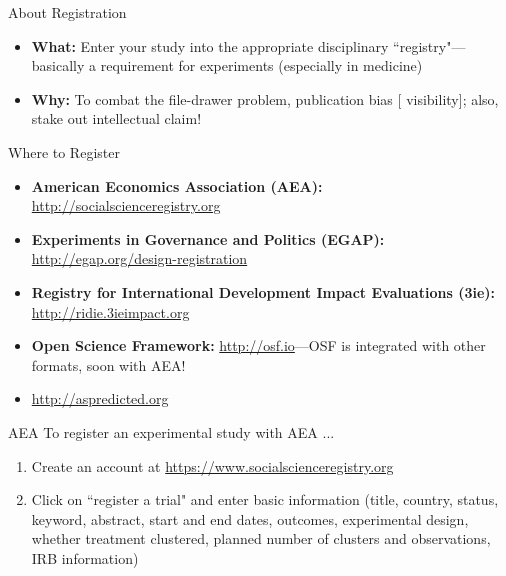 \documentclass[12pt, compress]{beamer} %
\let\noteitem\item %
\renewcommand{\item}{ 
	\noteitem\vspace{\fill}
	}
\newcommand{\nb}[1]{{\color{burntorange} {#1}}}
\begin{document}
	\begin{frame}{About Registration}
		\begin{itemize}
			\item \textbf{What:} Enter your study into the appropriate disciplinary ``registry"---basically a requirement for experiments (especially in medicine)
			\item \textbf{Why:} To combat the file-drawer problem, publication bias [\nb{visibility}]; also, stake out intellectual claim!
		\end{itemize}
	\end{frame}
	
%		
%		
	
	\begin{frame}{Where to Register}
		\begin{itemize}
			\item \textbf{American Economics Association (AEA):} \url{http://socialscienceregistry.org}
			\item \textbf{Experiments in Governance and Politics (EGAP):} \url{http://egap.org/design-registration}
			\item \textbf{Registry for International Development Impact Evaluations (3ie):} \url{http://ridie.3ieimpact.org}
			\item \textbf{Open Science Framework:} \url{http://osf.io}---OSF is integrated with other formats, soon with AEA!
			\item \url{http://aspredicted.org}
		\end{itemize}
		\end{frame}
	
	\begin{frame}{AEA}
		To register an experimental study with AEA ...
		\begin{enumerate}
			\item Create an account at \url{https://www.socialscienceregistry.org}
			\item Click on ``register a trial" and enter basic information (title, country, status, keyword, abstract, start and end dates, outcomes, experimental design, whether treatment clustered, planned number of clusters and observations, IRB information)
		\end{enumerate}
	\end{frame}	
		
\end{document}
